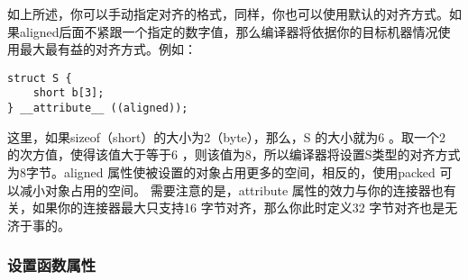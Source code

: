 			如上所述，你可以手动指定对齐的格式，同样，你也可以使用默认的对齐方式。如果aligned后面不紧跟一个指定的数字值，那么编译器将依据你的目标机器情况使用最大最有益的对齐方式。例如：

\begin{verbatim}
struct S {
	short b[3];
} __attribute__ ((aligned));
\end{verbatim}

			这里，如果sizeof（short）的大小为2（byte），那么，S 的大小就为6 。取一个2 的次方值，使得该值大于等于6 ，则该值为8，所以编译器将设置S类型的对齐方式为8字节。aligned 属性使被设置的对象占用更多的空间，相反的，使用packed 可以减小对象占用的空间。
			需要注意的是，attribute 属性的效力与你的连接器也有关，如果你的连接器最大只支持16 字节对齐，那么你此时定义32 字节对齐也是无济于事的。

			\subsubsection{设置函数属性}


